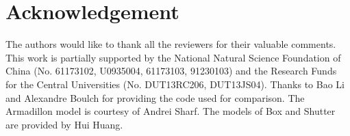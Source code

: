 \documentclass[preprint,5p,times,twocolumn]{elsarticle}
\begin{document}


%





\section*{Acknowledgement}
The authors would like to thank all the reviewers for their valuable comments.
%
This work is partially supported by the National Natural Science Foundation of China (No. 61173102, U0935004, 61173103, 91230103) and the Research Funds for the Central Universities (No. DUT13RC206, DUT13JS04).
%
Thanks to Bao Li and Alexandre Boulch for providing the code used for comparison.
%
The Armadillon model is courtesy of Andrei Sharf. The models of Box and Shutter are provided by Hui Huang.





%
%
%
%
\end{document}

